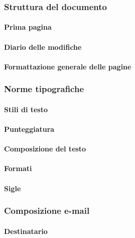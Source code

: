 \subsubsection{Struttura del documento}

\paragraph{Prima pagina}

\paragraph{Diario delle modifiche}

\paragraph{Formattazione generale delle pagine}

\subsubsection{Norme tipografiche}

\paragraph{Stili di testo}

\paragraph{Punteggiatura}

\paragraph{Composizione del testo}

\paragraph{Formati}

\paragraph{Sigle}

\subsubsection{Composizione e-mail}

\paragraph{Destinatario}

